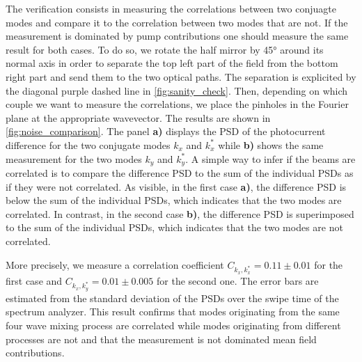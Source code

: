 The verification consists in measuring the correlations between two conjuagte modes and compare it to the correlation between two modes that are not.
If the measurement is dominated by pump contributions one should measure the same result for both cases. To do so, we rotate the half mirror by 45° around its normal axis in order to separate the top left part of the field from the bottom right part and send them to the two optical paths. The separation is explicited
by the diagonal purple dashed line in \autoref{fig:sanity_check}. Then, depending on which couple we want to measure the correlations, we place the pinholes in the Fourier plane at the appropriate wavevector.
The results are shown in \autoref{fig:noise_comparison}. The panel \textbf{a)} displays the PSD of the photocurrent difference for the two conjugate modes $k_x$ and $k_x^*$ while \textbf{b)} shows the same measurement for the two modes $k_y$ and $k_y^*$. 
A simple way to infer if the beams are correlated is to compare the difference PSD to the sum of the individual PSDs as if they were not correlated. As visible, in the first case \textbf{a)}, the difference PSD is below the sum of the individual PSDs, which indicates that the two modes are correlated. In contrast, in the second case \textbf{b)}, the difference PSD is superimposed to the sum of the individual PSDs, which indicates that the two modes are not correlated. 

More precisely, we measure a correlation coefficient $C_{k_x,k_x^*}=0.11\pm{0.01}$ for the first case and $C_{k_x,k_y^*}=0.01\pm{0.005}$ for the second one. The error bars are estimated from the standard deviation of the PSDs over the swipe time of the spectrum analyzer.
This result confirms that modes originating from the same four wave mixing process are correlated while modes originating from different processes are not and that the measurement is 
not dominated mean field contributions.


